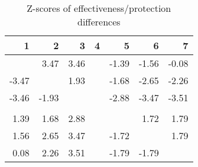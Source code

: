 \begin{table}[ht]
\centering
\begin{tabular}{rrrrrrr}
  \hline
1 & 2 & 3 & 4 & 5 & 6 & 7 \\ 
  \hline
 & 3.47 & 3.46 &  & -1.39 & -1.56 & -0.08 \\ 
  -3.47 &  & 1.93 &  & -1.68 & -2.65 & -2.26 \\ 
  -3.46 & -1.93 &  &  & -2.88 & -3.47 & -3.51 \\ 
   &  &  &  &  &  &  \\ 
  1.39 & 1.68 & 2.88 &  &  & 1.72 & 1.79 \\ 
  1.56 & 2.65 & 3.47 &  & -1.72 &  & 1.79 \\ 
  0.08 & 2.26 & 3.51 &  & -1.79 & -1.79 &  \\ 
   \hline
\end{tabular}
\caption{Z-scores of effectiveness/protection differences} 
\end{table}
